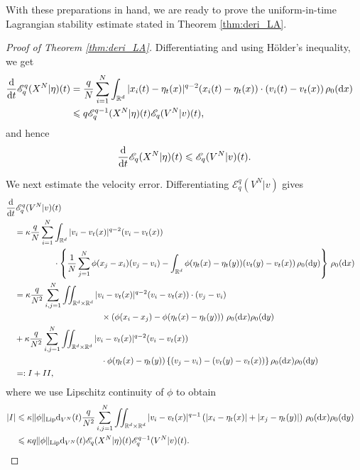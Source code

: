 \documentclass[10pt,reqno]{amsart}
\renewcommand{\leq}{\leqslant}
\numberwithin{equation}{section}
\newcommand{\R}{\mathbb R}
\newcommand{\bq}{\begin{equation}}
\newcommand{\eq}{\end{equation}}
\newcommand{\lt}{\left}
\newcommand{\rt}{\right}
\newcommand{\intr}{\int_{\R^d}}
\newcommand{\intrr}{\iint_{\R^d \times \R^d}}
\newcommand{\rd}{\textnormal{d}}
\newcommand{\dx}{\textnormal{d}x}
\newcommand{\dt}{\textnormal{d}t}
\newcommand{\dy}{\textnormal{d}y}
\begin{document}
With these preparations in hand, we are ready to prove the uniform-in-time Lagrangian stability estimate stated in Theorem \ref{thm:deri_LA}.

\begin{proof}[Proof of Theorem \ref{thm:deri_LA}]
 Differentiating and using H\"older's inequality, we get
\begin{align*}
\frac{\rd}{\dt} \mathscr{E}_q^q(X^N|\eta)(t) &= \frac qN\sum_{i=1}^N \intr |x_i(t) - \eta_t(x)|^{q-2}(x_i(t) - \eta_t(x)) \cdot (v_i(t) - v_t(x))\,\rho_0(\dx) \cr
& \leq q\mathscr{E}_q^{q-1}(X^N|\eta)(t) \mathscr{E}_q(V^N|v)(t),
\end{align*}
and hence
\bq\label{eq_pos}
\frac{\rd}{\dt} \mathscr{E}_q(X^N|\eta)(t) \leq \mathscr{E}_q(V^N|v)(t).
\eq

We next estimate the velocity error. Differentiating $\mathscr{E}_q^q(V^N|v)$ gives
\begin{align*}
&\frac{\rd}{\dt} \mathscr{E}_q^q(V^N|v)(t) \cr
&\quad = \kappa\frac qN \sum_{i=1}^N \intr |v_i - v_t(x)|^{q-2} (v_i - v_t(x)) \cr
&\hspace{2cm} \cdot \lt\{\frac1N \sum_{j=1}^N\phi (x_j - x_i)(v_j - v_i) - \intr \phi(\eta_t(x) - \eta_t(y)) (v_t(y) - v_t(x))\,\rho_0(\dy) \rt\}\,\rho_0(\dx)\cr
&\quad = \kappa\frac q{N^2} \sum_{i,j=1}^N \intrr  |v_i - v_t(x)|^{q-2}(v_i - v_t(x))\cdot (v_j - v_i)  \cr
&\hspace{4cm} \times  \lt(\phi(x_i - x_j) - \phi(\eta_t(x) - \eta_t(y)) \rt)  \,\rho_0(\dx)\rho_0(\dy) \cr
&\quad + \kappa\frac q{N^2} \sum_{i,j=1}^N \intrr  |v_i - v_t(x)|^{q-2}(v_i - v_t(x)) \cr
&\hspace{4cm} \cdot   \phi(\eta_t(x) - \eta_t(y))\lt\{ (v_j - v_i) - (v_t(y) - v_t(x)) \rt\}  \rho_0(\dx)\rho_0(\dy) \cr
&\quad=: I + II,
\end{align*}
 where we use Lipschitz continuity of $\phi$ to obtain
 \begin{align*}
 |I| &\leq \kappa  \|\phi\|_{\rm Lip} \rd_{V^N}(t)\frac q{N^2} \sum_{i,j=1}^N \intrr |v_i - v_t(x)|^{q-1} \lt( |x_i - \eta_t(x)| + |x_j  - \eta_t(y)|\rt)\,\rho_0(\dx)\rho_0(\dy)\cr
 &\leq  \kappa q \|\phi\|_{\rm Lip} \rd_{V^N}(t) \mathscr{E}_q(X^N|\eta)(t)  \mathscr{E}_q^{q-1}(V^N|v)(t).
 \end{align*}


\end{proof}
\end{document}
